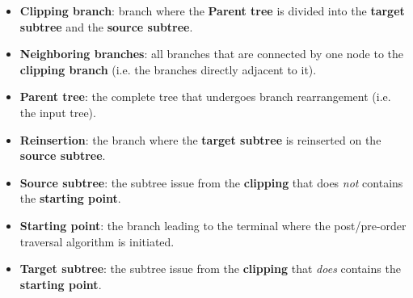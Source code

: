 \documentclass[12pt,letterpaper]{article}
\begin{document}
\begin{itemize}
    \item{\textbf{Clipping branch}: branch where the \textbf{Parent tree} is divided into the \textbf{target subtree} and the \textbf{source subtree}.}
    \item{\textbf{Neighboring branches}: all branches that are connected by one node to the \textbf{clipping branch} (i.e. the branches directly adjacent to it).}
    \item{\textbf{Parent tree}: the complete tree that undergoes branch rearrangement (i.e. the input tree).}
    \item{\textbf{Reinsertion}: the branch where the \textbf{target subtree} is reinserted on the \textbf{source subtree}.}
    \item{\textbf{Source subtree}: the subtree issue from the \textbf{clipping} that does \textit{not} contains the \textbf{starting point}.}
    \item{\textbf{Starting point}: the branch leading to the terminal where the post/pre-order traversal algorithm is initiated.}
    \item{\textbf{Target subtree}: the subtree issue from the \textbf{clipping} that \textit{does} contains the \textbf{starting point}.}
\end{itemize}

\end{document}
